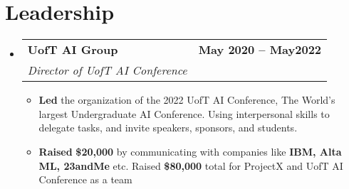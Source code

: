 \documentclass[letterpaper,11pt]{article}
\makeatletter
\newcommand{\resumeItem}[1]{
  \item\small{
    {#1 \vspace{-2pt}}
  }
}
\newcommand{\resumeSubheading}[4]{
  \vspace{-2pt}\item
    \begin{tabular*}{1.0\textwidth}[t]{l@{\extracolsep{\fill}}r}
      \textbf{#1} & \textbf{\small #2} \\
      \textit{\small#3} & \textit{\small #4} \\
    \end{tabular*}\vspace{-7pt}
}
\newcommand{\resumeSubHeadingListStart}{\begin{itemize}[leftmargin=0.0in, label={}]}
\newcommand{\resumeSubHeadingListEnd}{\end{itemize}}
\newcommand{\resumeItemListStart}{\begin{itemize}}
\newcommand{\resumeItemListEnd}{\end{itemize}\vspace{-5pt}}
\makeatother
\begin{document}
\section{Leadership}
    \resumeSubHeadingListStart
        \resumeSubheading{UofT AI Group}{May 2020 -- May2022}{Director of UofT AI Conference}{}
            \resumeItemListStart
                \resumeItem{\textbf{Led} the organization of the 2022 UofT AI Conference, The World's largest Undergraduate AI Conference. Using interpersonal skills to delegate tasks, and invite speakers, sponsors, and students.}
                \resumeItem{\textbf{Raised} \textbf{\$20,000} by communicating with companies like \textbf{IBM, Alta ML, 23andMe} etc. Raised \textbf{\$80,000} total for ProjectX and UofT AI Conference as a team}
            \resumeItemListEnd
        
    \resumeSubHeadingListEnd
\end{document}
